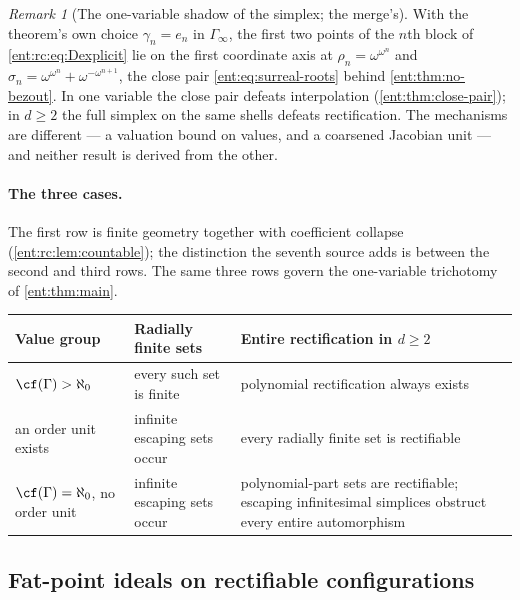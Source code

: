 \documentclass[11pt]{article}
\theoremstyle{plain}
\theoremstyle{plain}
\theoremstyle{plain}
\theoremstyle{definition}
\theoremstyle{definition}
\theoremstyle{definition}
\theoremstyle{definition}
\theoremstyle{remark}
\newtheorem{remark}[remark]{Remark}
\begin{document}
\begin{remark}[The one-variable shadow of the simplex; the merge's]
\label{ent:rc:rem:close-pair}
With the theorem's own choice $\gamma_n=e_n$ in $\Gamma_\infty$, the first two
points of the $n$th block of \eqref{ent:rc:eq:Dexplicit} lie on the first
coordinate axis at $\rho_n=\omega^{\omega^n}$ and
$\sigma_n=\omega^{\omega^n}+\omega^{-\omega^{n+1}}$, the close pair
\eqref{ent:eq:surreal-roots} behind \cref{ent:thm:no-bezout}. In one variable
the close pair defeats interpolation (\cref{ent:thm:close-pair}); in $d\ge2$
the full simplex on the same shells defeats rectification. The mechanisms are
different --- a valuation bound on values, and a coarsened Jacobian unit ---
and neither result is derived from the other.
\end{remark}

\paragraph{The three cases.} The first row is finite geometry together with
coefficient collapse (\cref{ent:rc:lem:countable}); the distinction the seventh
source adds is between the second and third rows. The same three rows govern
the one-variable trichotomy of \cref{ent:thm:main}.

\begin{center}
\small
\begin{tabular}{@{}>{\raggedright\arraybackslash}p{}>{\raggedright\arraybackslash}p{}>{\raggedright\arraybackslash}p{}@{}}
\toprule
Value group & Radially finite sets & Entire rectification in $d\ge2$\\
\midrule
$\cf(\Gamma)>\aleph_0$ & every such set is finite & polynomial
rectification always exists\\[3pt]
an order unit exists & infinite escaping sets occur & every radially finite
set is rectifiable\\[3pt]
$\cf(\Gamma)=\aleph_0$, no order unit & infinite escaping sets occur &
polynomial-part sets are rectifiable; escaping infinitesimal simplices
obstruct every entire automorphism\\
\bottomrule
\end{tabular}
\end{center}

\subsection{Fat-point ideals on rectifiable configurations}
\label{ent:rc:subsec:ideals}
\end{document}
